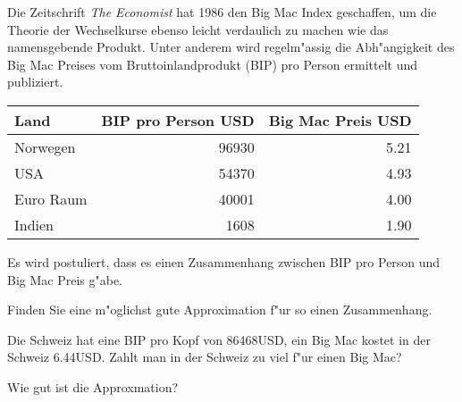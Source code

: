 Die Zeitschrift {\em The Economist} hat 1986 den Big Mac Index geschaffen,
um die Theorie der Wechselkurse ebenso leicht verdaulich zu machen wie
das namensgebende Produkt.
Unter anderem wird regelm"assig die Abh"angigkeit des Big Mac Preises
vom Bruttoinlandprodukt (BIP) pro Person ermittelt und publiziert.
\begin{center}
\begin{tabular}{|l|r|r|}
\hline
Land&BIP pro Person USD&Big Mac Preis USD\\
\hline
Norwegen   &96930&5.21\\
USA        &54370&4.93\\
Euro Raum  &40001&4.00\\
Indien     & 1608&1.90\\
\hline
\end{tabular}
\end{center}
Es wird postuliert, dass es einen Zusammenhang zwischen 
BIP pro Person und Big Mac Preis g"abe.

\begin{teilaufgaben}
\item Finden Sie eine m"oglichst gute Approximation f"ur so einen Zusammenhang.
\item Die Schweiz hat eine BIP pro Kopf von 86468USD, ein Big Mac kostet
in der Schweiz 6.44USD.
Zahlt man in der Schweiz zu viel f"ur einen Big Mac?
\item Wie gut ist die Approxmation?
\end{teilaufgaben}

